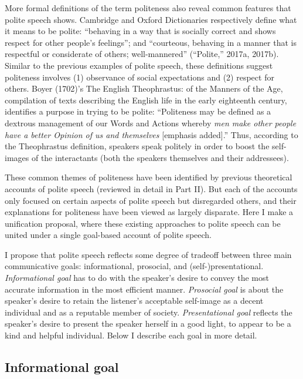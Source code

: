 \documentclass[oneside]{report}
\begin{document}
More formal definitions of the term politeness also reveal common
features that polite speech shows. Cambridge and Oxford Dictionaries
respectively define what it means to be polite: ``behaving in a way that
is socially correct and shows respect for other people's feelings''; and
``courteous, behaving in a manner that is respectful or considerate of
others; well-mannered'' (``Polite,'' 2017a, 2017b). Similar to the
previous examples of polite speech, these definitions suggest politeness
involves (1) observance of social expectations and (2) respect for
others. Boyer (1702)'s The English Theophrastus: of the Manners of the
Age, compilation of texts describing the English life in the early
eighteenth century, identifies a purpose in trying to be polite:
``Politeness may be defined as a dextrous management of our Words and
Actions whereby \emph{men make other people have a better Opinion of us
and themselves} {[}emphasis added{]}.'' Thus, according to the
Theophrastus definition, speakers speak politely in order to boost the
self-images of the interactants (both the speakers themselves and their
addressees).

These common themes of politeness have been identified by previous
theoretical accounts of polite speech (reviewed in detail in Part II).
But each of the accounts only focused on certain aspects of polite
speech but disregarded others, and their explanations for politeness
have been viewed as largely disparate. Here I make a unification
proposal, where these existing approaches to polite speech can be united
under a single goal-based account of polite speech.

I propose that polite speech reflects some degree of tradeoff between
three main communicative goals: informational, prosocial, and
(self-)presentational. \emph{Informational goal} has to do with the
speaker's desire to convey the most accurate information in the most
efficient manner. \emph{Prosocial goal} is about the speaker's desire to
retain the listener's acceptable self-image as a decent individual and
as a reputable member of society. \emph{Presentational goal} reflects
the speaker's desire to present the speaker herself in a good light, to
appear to be a kind and helpful individual. Below I describe each goal
in more detail.

\subsection{Informational goal}\label{informational-goal}
\end{document}
